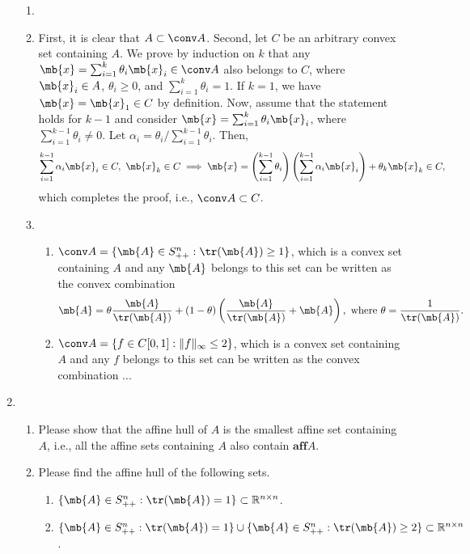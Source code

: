 \begin{exercise}
\begin{enumerate}
      \begin{solution}
        \begin{enumerate}
          \item []
          \item First, it is clear that $A \subset \conv A$. Second, let $C$ be an arbitrary convex set containing $A$. We prove by induction on $k$ that any $\mb{x} = \sum_{i=1}^k \theta_i \mb{x}_i \in \conv A$ also belongs to $C$, where $\mb{x}_i \in A$, $\theta_i \ge 0$, and $\sum_{i=1}^k \theta_i = 1$. If $k=1$, we have $\mb{x} = \mb{x}_1 \in C$ by definition. Now, assume that the statement holds for $k-1$ and consider $\mb{x} = \sum_{i=1}^k \theta_i \mb{x}_i$, where $\sum_{i=1}^{k-1} \theta_i\neq 0$. Let $\alpha_i = \theta_i / \sum_{i=1}^{k-1} \theta_i$. Then, $$\sum_{i=1}^{k-1} \alpha_i \mb{x}_i\in C,\ \mb{x}_k\in C \implies \mb{x} = \left(\sum_{i=1}^{k-1} \theta_i\right) \left(\sum_{i=1}^{k-1} \alpha_i \mb{x}_i\right) + \theta_k \mb{x}_k\in C,$$ which completes the proof, i.e., $\conv A \subset C$.
          \item 
            \begin{enumerate}
              \item $\conv A = \{ \mb{A} \in S^n_{++}: \tr(\mb{A}) \ge 1 \}$, which is a convex set containing $A$ and any $\mb{A}$ belongs to this set can be written as the convex combination $$\mb{A} = \theta \frac{\mb{A}}{\tr (\mb{A})} + (1-\theta)\left(\frac{\mb{A}}{\tr (\mb{A})} + \mb{A}\right),\ \text{where}\ \theta = \frac{1}{\tr(\mb{A})}.$$
              \item $\conv A = \{f\in C[0,1]: \|f\|_\infty \le 2\}$, which is a convex set containing $A$ and any $f$ belongs to this set can be written as the convex combination ...
              \qedhere
            \end{enumerate}
        \end{enumerate}
      \end{solution}
    \item \begin{enumerate}
        \item Please show that the affine hull of $A$ is the smallest affine set containing $A$, i.e., all the affine sets containing $A$ also contain $\textbf{aff} A$.
        \item Please find the affine hull of the following sets.
          \begin{enumerate}
            \item $\{\mb{A}\in S_{++}^n: \tr(\mb{A})=1\}\subset\mathbb{R}^{n\times n}$.
            \item $\{\mb{A}\in S_{++}^n: \tr(\mb{A})=1\}\cup \{\mb{A}\in S_{++}^n: \tr(\mb{A})\ge2\}\subset\mathbb{R}^{n\times n}$.
          \end{enumerate}
      \end{enumerate}


\end{enumerate}
\end{exercise}
